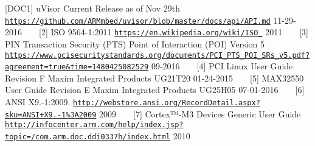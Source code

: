 \label{_r_e_f_e_r_e_n_c_e_s_DOC1}%
\hypertarget{_r_e_f_e_r_e_n_c_e_s_DOC1}{}%
\mbox{[}D\+O\+C1\mbox{]} u\+Visor Current Release as of Nov 29th \href{https://github.com/ARMmbed/uvisor/blob/master/docs/api/API.md}{\tt https\+://github.\+com/\+A\+R\+Mmbed/uvisor/blob/master/docs/api/\+A\+P\+I.\+md} 11-\/29-\/2016 ~\newline
~\newline
\label{_r_e_f_e_r_e_n_c_e_s_DOC2}%
\hypertarget{_r_e_f_e_r_e_n_c_e_s_DOC2}{}%
\mbox{[}2\mbox{]} I\+SO 9564-\/1\+:2011 \href{https://en.wikipedia.org/wiki/ISO_9564}{\tt https\+://en.\+wikipedia.\+org/wiki/\+I\+S\+O\+\_} 2011 ~\newline
~\newline
\label{_r_e_f_e_r_e_n_c_e_s_DOC3}%
\hypertarget{_r_e_f_e_r_e_n_c_e_s_DOC3}{}%
\mbox{[}3\mbox{]} P\+IN Transaction Security (P\+TS) Point of Interaction (P\+OI) Version 5 \href{https://www.pcisecuritystandards.org/documents/PCI_PTS_POI_SRs_v5.pdf?agreement=true&time=1480425082529}{\tt https\+://www.\+pcisecuritystandards.\+org/documents/\+P\+C\+I\+\_\+\+P\+T\+S\+\_\+\+P\+O\+I\+\_\+\+S\+Rs\+\_\+v5.\+pdf?agreement=true\&time=1480425082529} 09-\/2016 ~\newline
~\newline
\label{_r_e_f_e_r_e_n_c_e_s_DOC4}%
\hypertarget{_r_e_f_e_r_e_n_c_e_s_DOC4}{}%
\mbox{[}4\mbox{]} P\+CI Linux User Guide Revision F Maxim Integrated Products U\+G21\+T20 01-\/24-\/2015 ~\newline
~\newline
\label{_r_e_f_e_r_e_n_c_e_s_DOC5}%
\hypertarget{_r_e_f_e_r_e_n_c_e_s_DOC5}{}%
\mbox{[}5\mbox{]} M\+A\+X32550 User Guide Revision E Maxim Integrated Products U\+G25\+H05 07-\/01-\/2016 ~\newline
~\newline
\label{_r_e_f_e_r_e_n_c_e_s_DOC6}%
\hypertarget{_r_e_f_e_r_e_n_c_e_s_DOC6}{}%
\mbox{[}6\mbox{]} A\+N\+SI X9.-\/1\+:2009. \href{http://webstore.ansi.org/RecordDetail.aspx?sku=ANSI+X9.24-1%3A2009}{\tt http\+://webstore.\+ansi.\+org/\+Record\+Detail.\+aspx?sku=\+A\+N\+S\+I+\+X9.\+24-\/1\%3\+A2009} 2009 ~\newline
~\newline
\label{_r_e_f_e_r_e_n_c_e_s_DOC7}%
\hypertarget{_r_e_f_e_r_e_n_c_e_s_DOC7}{}%
\mbox{[}7\mbox{]} Cortex™-\/\+M3 Devices Generic User Guide \href{http://infocenter.arm.com/help/index.jsp?topic=/com.arm.doc.ddi0337h/index.html}{\tt http\+://infocenter.\+arm.\+com/help/index.\+jsp?topic=/com.\+arm.\+doc.\+ddi0337h/index.\+html} 2010 ~\newline
